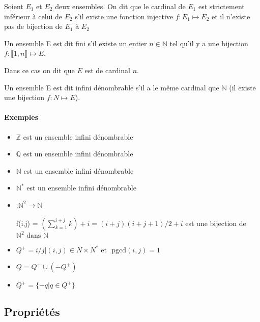 \documentclass[12pt, a4paper]{report}
\begin{document}
Soient $E_1$ et $E_2$ deux ensembles. On dit que le cardinal de $E_1$ est strictement inférieur
à celui de $E_2$ s'il existe une fonction injective $f : E_1 \mapsto E_2$ et il n'existe pas de
bijection de $E_1$ à $E_2$

Un ensemble E est dit fini s'il existe un entier $n \in \mathbb{N}$ tel qu'il y a une bijection
$f : \llbracket 1, n \rrbracket \mapsto E$. %

Dans ce cas on dit que $E$ est de cardinal $n$. %

Un ensemble E est dit infini dénombrable s'il a le même cardinal que $\mathbb{N}$ %
(il existe une bijection $f : N \mapsto E$).

\paragraph{Exemples}
\begin{itemize}


\item{$\mathbb{Z}$ est un ensemble infini dénombrable}

\item{$\mathbb{Q}$ est un ensemble infini dénombrable}

\item{$\mathbb{N}$ est un ensemble infini dénombrable}

\item{$\mathbb{N}^*$ est un ensemble infini dénombrable}


\item{:$\mathbb{N}^2  \rightarrow \mathbb{N}$

f(i,j) = $(\sum_{k=1}^{i+j} k) + i = (i+j)(i+j+1)/2 + i$ est une bijection de $\mathbb{N}^2  \text{ dans } \mathbb{N}$}

\item{$Q^{+} = {i/j | (i,j) \in N\times N^{*} \text{ et }\text{ pgcd}(i, j) = 1}$}

\item{$Q = Q^{+} \cup (- Q^{+})$}

\item{$Q^{+} = \{ -q | q \in Q^{+}\}$}

\end{itemize}



\subsection{Propriétés}
\end{document}
